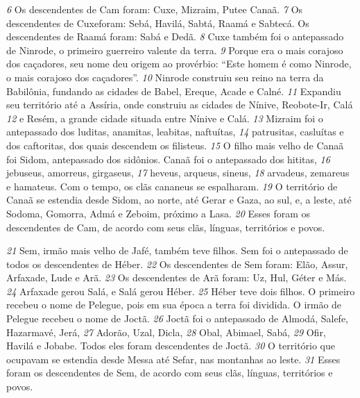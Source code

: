 \bigskip
\textit{\tiny 6}
 Os descendentes de Cam foram: Cuxe, Mizraim, Putee Canaã. 
\textit{\tiny 7}
 Os descendentes de Cuxeforam: Sebá, Havilá, Sabtá, Raamá e Sabtecá. Os descendentes de Raamá foram: Sabá e Dedã. 
\textit{\tiny 8}
 Cuxe também foi o antepassado de Ninrode, o primeiro guerreiro valente da terra. 
\textit{\tiny 9}
 Porque era o mais corajoso dos caçadores, seu nome deu origem ao provérbio: “Este homem é como Ninrode, o mais corajoso dos caçadores”. 
\textit{\tiny 10}
 Ninrode construiu seu reino na terra da Babilônia, fundando as cidades de Babel, Ereque, Acade e Calné. 
\textit{\tiny 11}
 Expandiu seu território até a Assíria, onde construiu as cidades de Nínive, Reobote-Ir, Calá 
\textit{\tiny 12}
 e Resém, a grande cidade situada entre Nínive e Calá. 
\textit{\tiny 13}
 Mizraim foi o antepassado dos luditas, anamitas, leabitas, naftuítas, 
\textit{\tiny 14}
 patrusitas, casluítas e dos caftoritas, dos quais descendem os filisteus. 
\textit{\tiny 15}
 O filho mais velho de Canaã foi Sidom, antepassado dos sidônios. Canaã foi o antepassado dos hititas, 
\textit{\tiny 16}
 jebuseus, amorreus, girgaseus, 
\textit{\tiny 17}
 heveus, arqueus, sineus, 
\textit{\tiny 18}
 arvadeus, zemareus e hamateus. Com o tempo, os clãs cananeus se espalharam. 
\textit{\tiny 19}
 O território de Canaã se estendia desde Sidom, ao norte, até Gerar e Gaza, ao sul, e, a leste, até Sodoma, Gomorra, Admá e Zeboim, próximo a Lasa. 
\textit{\tiny 20}
 Esses foram os descendentes de Cam, de acordo com seus clãs, línguas, territórios e povos.


\bigskip
\textit{\tiny 21}
 Sem, irmão mais velho de Jafé, também teve filhos. Sem foi o antepassado de todos os descendentes de Héber. 
\textit{\tiny 22}
 Os descendentes de Sem foram: Elão, Assur, Arfaxade, Lude e Arã. 
\textit{\tiny 23}
 Os descendentes de Arã foram: Uz, Hul, Géter e Más. 
\textit{\tiny 24}
 Arfaxade gerou Salá, e Salá gerou Héber. 
\textit{\tiny 25}
 Héber teve dois filhos. O primeiro recebeu o nome de Pelegue, pois em sua época a terra foi dividida. O irmão de Pelegue recebeu o nome de Joctã. 
\textit{\tiny 26}
 Joctã foi o antepassado de Almodá, Salefe, Hazarmavé, Jerá, 
\textit{\tiny 27}
 Adorão, Uzal, Dicla, 
\textit{\tiny 28}
 Obal, Abimael, Sabá, 
\textit{\tiny 29}
 Ofir, Havilá e Jobabe. Todos eles foram descendentes de Joctã. 
\textit{\tiny 30}
 O território que ocupavam se estendia desde Messa até Sefar, nas montanhas ao leste. 
\textit{\tiny 31}
 Esses foram os descendentes de Sem, de acordo com seus clãs, línguas, territórios e povos.



